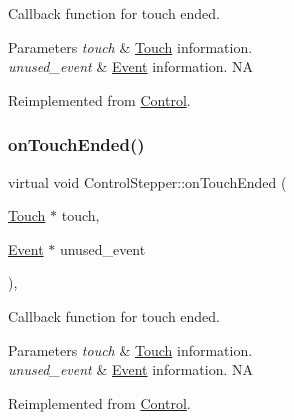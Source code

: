 Callback function for touch ended.


\begin{DoxyParams}{Parameters}
{\em touch} & \hyperlink{classTouch}{Touch} information. \\
\hline
{\em unused\+\_\+event} & \hyperlink{classEvent}{Event} information.  NA \\
\hline
\end{DoxyParams}


Reimplemented from \hyperlink{classControl_a56073e57060169fe80cbb6ce1f4abe28}{Control}.

\mbox{\label{classControlStepper_a7934349dae09881fce7a72d4985d0154}} 
\subsubsection{\texorpdfstring{on\+Touch\+Ended()}{onTouchEnded()}\hspace{0.1cm}{\footnotesize\ttfamily [2/2]}}
{\footnotesize\ttfamily virtual void Control\+Stepper\+::on\+Touch\+Ended (\begin{DoxyParamCaption}\item[{\hyperlink{classTouch}{Touch} $\ast$}]{touch,  }\item[{\hyperlink{classEvent}{Event} $\ast$}]{unused\+\_\+event }\end{DoxyParamCaption})\hspace{0.3cm}{\ttfamily [override]}, {\ttfamily [virtual]}}

Callback function for touch ended.


\begin{DoxyParams}{Parameters}
{\em touch} & \hyperlink{classTouch}{Touch} information. \\
\hline
{\em unused\+\_\+event} & \hyperlink{classEvent}{Event} information.  NA \\
\hline
\end{DoxyParams}


Reimplemented from \hyperlink{classControl_a56073e57060169fe80cbb6ce1f4abe28}{Control}.

\mbox{\label{classControlStepper_a83a981cc66f6e1669b079b83842d6b79}} 
